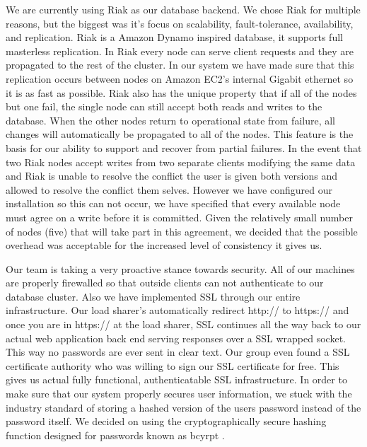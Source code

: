 \documentclass{dependencies/acm_proc_article-sp}
\begin{document}
We are currently using Riak as our database backend. We chose Riak for multiple
reasons, but the biggest was it's focus on  scalability, fault-tolerance,
availability, and replication. Riak is a Amazon Dynamo \cite{dynamo} inspired
database, it supports full masterless replication. In Riak every node can
serve client requests and they are propagated to the rest of the cluster.
In our system we have made sure that this replication occurs between nodes
on Amazon EC2's internal Gigabit ethernet so it is as fast as possible. Riak
also has the unique property that if all of the nodes but one fail, the single
node can still accept both reads and writes to the database. When the other
nodes return to operational state from failure, all changes will automatically
be propagated to all of the nodes. This feature is the basis for our ability to
support and recover from partial failures. In the event that two Riak nodes accept
writes from two separate clients modifying the same data and Riak is unable
to resolve the conflict the user is given both versions and allowed to resolve
the conflict them selves. However we have configured our installation so this
can not occur, we have specified that every available node must agree on a
write before it is committed. Given the relatively small number of nodes (five)
that will take part in this agreement, we decided that the possible overhead
was acceptable for the increased level of consistency it gives us.

Our team is taking a very proactive stance towards security. All of our machines are properly firewalled so that
outside clients can not authenticate to our database cluster. Also we have implemented SSL through our entire infrastructure.
Our load sharer's automatically redirect http:// to https:// and once you are in https:// at the load sharer, SSL continues all the
way back to our actual web application back end serving responses over a SSL wrapped socket. This way no passwords are ever
sent in clear text. Our group even found a SSL certificate authority who was willing to sign our SSL certificate for free. This gives
us actual fully functional, authenticatable SSL infrastructure. In order to make sure that our system properly secures user information,
we stuck with the industry standard of storing a hashed version of the users password instead of the password itself. We decided on using
the cryptographically secure hashing function designed for passwords known as bcyrpt \cite{bcrypt}.

\newpage
%

%
%
\balancecolumns
\end{document}
